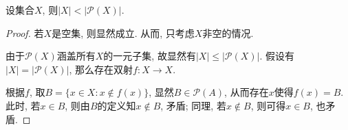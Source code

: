 \begin{theorem}{}
	设集合$X$, 则$|X|< |\mathcal{P}(X)|$.
\end{theorem}
\begin{proof}
	若$X$是空集, 则显然成立. 从而, 只考虑$X$非空的情况. 
	
	由于$\mathcal{P}(X)$涵盖所有$X$的一元子集, 故显然有$|X| \leq |\mathcal{P}(X)|$. 假设有$|X| = | \mathcal{P}(X)|$, 那么存在双射$f: X \to X$. 
	
	根据$f$, 取$B=\{ x \in X: x \notin f(x) \}$, 显然$B \in \mathcal{P}(A)$, 从而存在$x$使得$f(x)=B$. 此时, 若$x \in B$, 则由$B$的定义知$x \notin B$, 矛盾; 同理, 若$x \notin B$, 则可得$x \in B$, 也矛盾. 
\end{proof}

